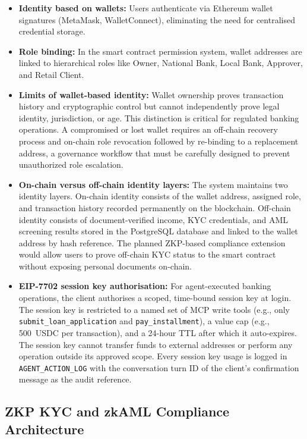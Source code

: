 \documentclass[12pt,a4paper]{report}
\begin{document}
\begin{itemize}[noitemsep]
\item \textbf{Identity based on wallets:} Users authenticate via Ethereum wallet signatures (MetaMask, WalletConnect), eliminating the need for centralised credential storage.
\item \textbf{Role binding:} In the smart contract permission system, wallet addresses are linked to hierarchical roles like Owner, National Bank, Local Bank, Approver, and Retail Client.
\item \textbf{Limits of wallet-based identity:} Wallet ownership proves transaction history and cryptographic control but cannot independently prove legal identity, jurisdiction, or age. This distinction is critical for regulated banking operations. A compromised or lost wallet requires an off-chain recovery process and on-chain role revocation followed by re-binding to a replacement address, a governance workflow that must be carefully designed to prevent unauthorized role escalation.
\item \textbf{On-chain versus off-chain identity layers:} The system maintains two identity layers. On-chain identity consists of the wallet address, assigned role, and transaction history recorded permanently on the blockchain. Off-chain identity consists of document-verified income, KYC credentials, and AML screening results stored in the PostgreSQL database and linked to the wallet address by hash reference. The planned ZKP-based compliance extension would allow users to prove off-chain KYC status to the smart contract without exposing personal documents on-chain.
\item \textbf{EIP-7702 session key authorisation:} For agent-executed banking operations, the client authorises a scoped, time-bound session key at login. The session key is restricted to a named set of MCP write tools (e.g., only \texttt{submit\_loan\_application} and \texttt{pay\_installment}), a value cap (e.g., 500~USDC per transaction), and a 24-hour TTL after which it auto-expires. The session key cannot transfer funds to external addresses or perform any operation outside its approved scope. Every session key usage is logged in \texttt{AGENT\_ACTION\_LOG} with the conversation turn ID of the client's confirmation message as the audit reference.
\end{itemize}

\subsection{ZKP KYC and zkAML Compliance Architecture}
\label{sec:identity}
\end{document}
